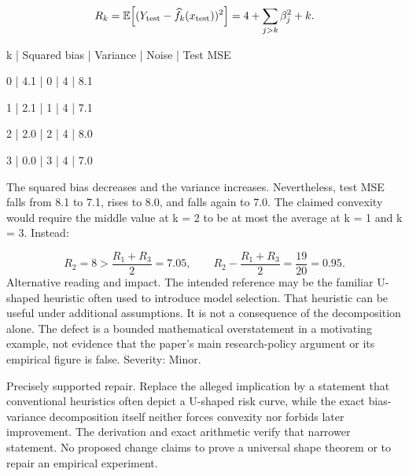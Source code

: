 \documentclass[10pt]{article}
\begin{document}
\[R_k=\mathbb E\!\left[(Y_{\rm test}-\widehat f_k(x_{\rm test}))^2\right]=4+\sum_{j>k}\beta_j^2+k.\]\par
k | Squared bias | Variance | Noise | Test MSE\par
0 | 4.1 | 0 | 4 | 8.1\par
1 | 2.1 | 1 | 4 | 7.1\par
2 | 2.0 | 2 | 4 | 8.0\par
3 | 0.0 | 3 | 4 | 7.0\par
The squared bias decreases and the variance increases. Nevertheless, test MSE falls from 8.1 to 7.1, rises to 8.0, and falls again to 7.0. The claimed convexity would require the middle value at k = 2 to be at most the average at k = 1 and k = 3. Instead:\par
\[R_2=8>\frac{R_1+R_3}{2}=7.05,\qquad R_2-\frac{R_1+R_3}{2}=\frac{19}{20}=0.95.\] Alternative reading and impact. The intended reference may be the familiar U-shaped heuristic often used to introduce model selection. That heuristic can be useful under additional assumptions. It is not a consequence of the decomposition alone. The defect is a bounded mathematical overstatement in a motivating example, not evidence that the paper’s main research-policy argument or its empirical figure is false. Severity: Minor.\par
Precisely supported repair. Replace the alleged implication by a statement that conventional heuristics often depict a U-shaped risk curve, while the exact bias-variance decomposition itself neither forces convexity nor forbids later improvement. The derivation and exact arithmetic verify that narrower statement. No proposed change claims to prove a universal shape theorem or to repair an empirical experiment.\par
\end{document}
